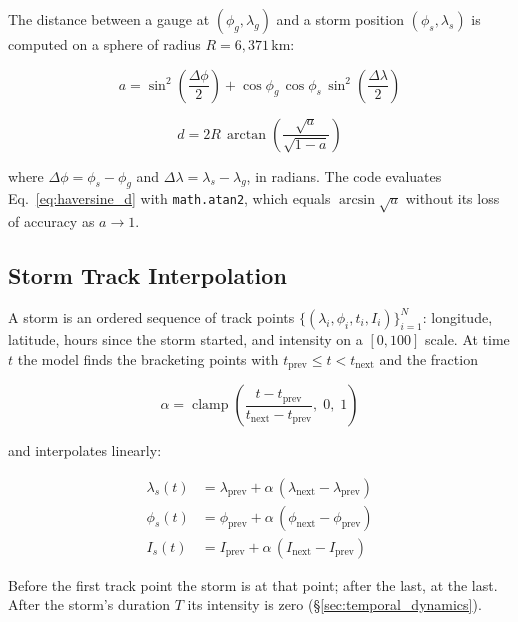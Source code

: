 \documentclass[11pt,a4paper]{article}
\begin{document}
The distance between a gauge at $(\phi_g, \lambda_g)$ and a storm position
$(\phi_s, \lambda_s)$ is computed on a sphere of radius $R = 6{,}371$\,km:

\begin{equation}
    a = \sin^2\!\left(\frac{\Delta\phi}{2}\right)
      + \cos\phi_g \,\cos\phi_s \,\sin^2\!\left(\frac{\Delta\lambda}{2}\right)
    \label{eq:haversine_a}
\end{equation}

\begin{equation}
    d = 2R \,\arctan\!\left(\frac{\sqrt{a}}{\sqrt{1-a}}\right)
    \label{eq:haversine_d}
\end{equation}

\noindent where $\Delta\phi = \phi_s - \phi_g$ and $\Delta\lambda = \lambda_s - \lambda_g$,
in radians. The code evaluates Eq.~\ref{eq:haversine_d} with \texttt{math.atan2}, which
equals $\arcsin\sqrt{a}$ without its loss of accuracy as $a\to1$.

\subsection{Storm Track Interpolation}
\label{sec:track_interp}

A storm is an ordered sequence of track points $\{(\lambda_i, \phi_i, t_i, I_i)\}_{i=1}^{N}$:
longitude, latitude, hours since the storm started, and intensity on a $[0, 100]$ scale.
At time $t$ the model finds the bracketing points with
$t_{\text{prev}} \leq t < t_{\text{next}}$ and the fraction

\begin{equation}
    \alpha = \operatorname{clamp}\!\left(
        \frac{t - t_{\text{prev}}}{t_{\text{next}} - t_{\text{prev}}},\; 0,\; 1
    \right)
    \label{eq:interp_frac}
\end{equation}

\noindent and interpolates linearly:

\begin{align}
    \lambda_s(t) &= \lambda_{\text{prev}} + \alpha\,(\lambda_{\text{next}} - \lambda_{\text{prev}}) \label{eq:interp_lon} \\
    \phi_s(t) &= \phi_{\text{prev}} + \alpha\,(\phi_{\text{next}} - \phi_{\text{prev}}) \label{eq:interp_lat} \\
    I_s(t) &= I_{\text{prev}} + \alpha\,(I_{\text{next}} - I_{\text{prev}}) \label{eq:interp_intensity}
\end{align}

\noindent Before the first track point the storm is at that point; after the last, at the
last. After the storm's duration $T$ its intensity is zero (\S\ref{sec:temporal_dynamics}).
\end{document}
